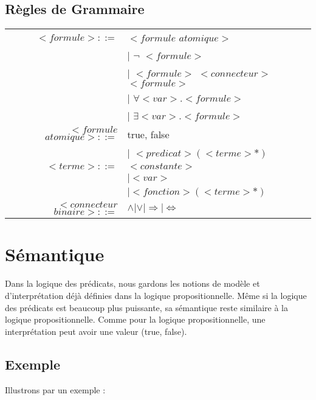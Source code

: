 \subsection{Règles de Grammaire}
\begin{tabular}{rl}
$<formule>::=$ 	  &	$<formule$ $atomique>$ \\
				  & $\vert$ $\neg$ $<formule>$ \\
				  & $\vert$ $<formule>$ $<connecteur>$ $<formule>$ \\
				  & $\vert$ $\forall <var>.<formule>$ \\
				  & $\vert$ $\exists <var>.<formule>$ \\
$<formule$ $atomique>::=$ 
				  & true, false \\
				  & $\vert$ $<predicat>(<terme>*)$ \\
$<terme>::=$	  & $<constante>$ \\
				  & $\vert <var>$ \\
				  & $\vert <fonction>(<terme>*)$ \\
$<connecteur$ $binaire>::=$ 
				  & $\wedge \vert \vee \vert \Rightarrow \vert \Leftrightarrow$ \\

\end{tabular}

\section{Sémantique}

Dans la logique des prédicats, nous gardons les notions de modèle et d'interprétation déjà définies dans la logique propositionnelle. Même si la logique des prédicats est beaucoup plus puissante, sa sémantique reste similaire à la logique propositionnelle.
Comme pour la logique propositionnelle, une interprétation peut avoir une valeur (true, false).

\subsection{Exemple}
Illustrons par un exemple : 

